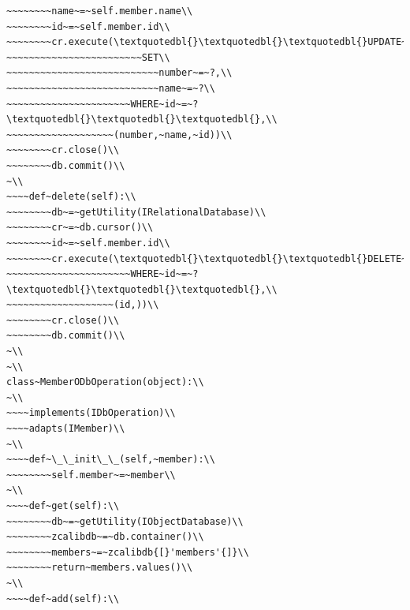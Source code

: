 \documentclass[a4paper,openany,twoside,draft]{book}
\begin{document}
\begin{verbatim}
~~~~~~~~name~=~self.member.name\\
~~~~~~~~id~=~self.member.id\\
~~~~~~~~cr.execute(\textquotedbl{}\textquotedbl{}\textquotedbl{}UPDATE~members\\
~~~~~~~~~~~~~~~~~~~~~~~~SET\\
~~~~~~~~~~~~~~~~~~~~~~~~~~~number~=~?,\\
~~~~~~~~~~~~~~~~~~~~~~~~~~~name~=~?\\
~~~~~~~~~~~~~~~~~~~~~~WHERE~id~=~?\textquotedbl{}\textquotedbl{}\textquotedbl{},\\
~~~~~~~~~~~~~~~~~~~(number,~name,~id))\\
~~~~~~~~cr.close()\\
~~~~~~~~db.commit()\\
~\\
~~~~def~delete(self):\\
~~~~~~~~db~=~getUtility(IRelationalDatabase)\\
~~~~~~~~cr~=~db.cursor()\\
~~~~~~~~id~=~self.member.id\\
~~~~~~~~cr.execute(\textquotedbl{}\textquotedbl{}\textquotedbl{}DELETE~FROM~members\\
~~~~~~~~~~~~~~~~~~~~~~WHERE~id~=~?\textquotedbl{}\textquotedbl{}\textquotedbl{},\\
~~~~~~~~~~~~~~~~~~~(id,))\\
~~~~~~~~cr.close()\\
~~~~~~~~db.commit()\\
~\\
~\\
class~MemberODbOperation(object):\\
~\\
~~~~implements(IDbOperation)\\
~~~~adapts(IMember)\\
~\\
~~~~def~\_\_init\_\_(self,~member):\\
~~~~~~~~self.member~=~member\\
~\\
~~~~def~get(self):\\
~~~~~~~~db~=~getUtility(IObjectDatabase)\\
~~~~~~~~zcalibdb~=~db.container()\\
~~~~~~~~members~=~zcalibdb{[}'members'{]}\\
~~~~~~~~return~members.values()\\
~\\
~~~~def~add(self):\\

\end{verbatim}
\end{document}

